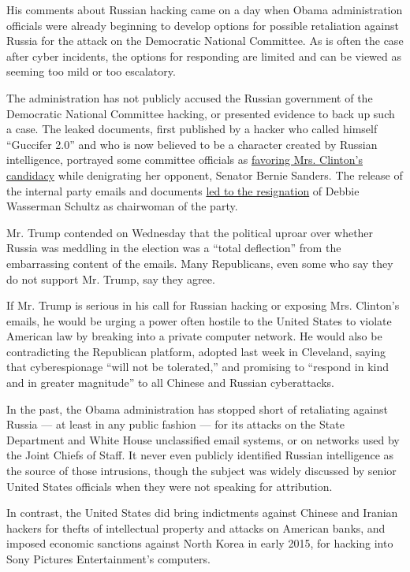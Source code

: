 His comments about Russian hacking came on a day when Obama
administration officials were already beginning to develop options for
possible retaliation against Russia for the attack on the Democratic
National Committee. As is often the case after cyber incidents, the
options for responding are limited and can be viewed as seeming too mild
or too escalatory.

The administration has not publicly accused the Russian government of
the Democratic National Committee hacking, or presented evidence to back
up such a case. The leaked documents, first published by a hacker who
called himself ``Guccifer 2.0'' and who is now believed to be a
character created by Russian intelligence, portrayed some committee
officials as
\href{https://www.nytimes.com/2016/07/23/us/politics/dnc-emails-sanders-clinton.html}{favoring
Mrs. Clinton's candidacy} while denigrating her opponent, Senator Bernie
Sanders. The release of the internal party emails and documents
\href{https://www.nytimes.com/2016/07/25/us/politics/debbie-wasserman-schultz-dnc-wikileaks-emails.html}{led
to the resignation} of Debbie Wasserman Schultz as chairwoman of the
party.

Mr. Trump contended on Wednesday that the political uproar over whether
Russia was meddling in the election was a ``total deflection'' from the
embarrassing content of the emails. Many Republicans, even some who say
they do not support Mr. Trump, say they agree.

If Mr. Trump is serious in his call for Russian hacking or exposing Mrs.
Clinton's emails, he would be urging a power often hostile to the United
States to violate American law by breaking into a private computer
network. He would also be contradicting the Republican platform, adopted
last week in Cleveland, saying that cyberespionage ``will not be
tolerated,'' and promising to ``respond in kind and in greater
magnitude'' to all Chinese and Russian cyberattacks.

In the past, the Obama administration has stopped short of retaliating
against Russia --- at least in any public fashion --- for its attacks on
the State Department and White House unclassified email systems, or on
networks used by the Joint Chiefs of Staff. It never even publicly
identified Russian intelligence as the source of those intrusions,
though the subject was widely discussed by senior United States
officials when they were not speaking for attribution.

In contrast, the United States did bring indictments against Chinese and
Iranian hackers for thefts of intellectual property and attacks on
American banks, and imposed economic sanctions against North Korea in
early 2015, for hacking into Sony Pictures Entertainment's computers.

